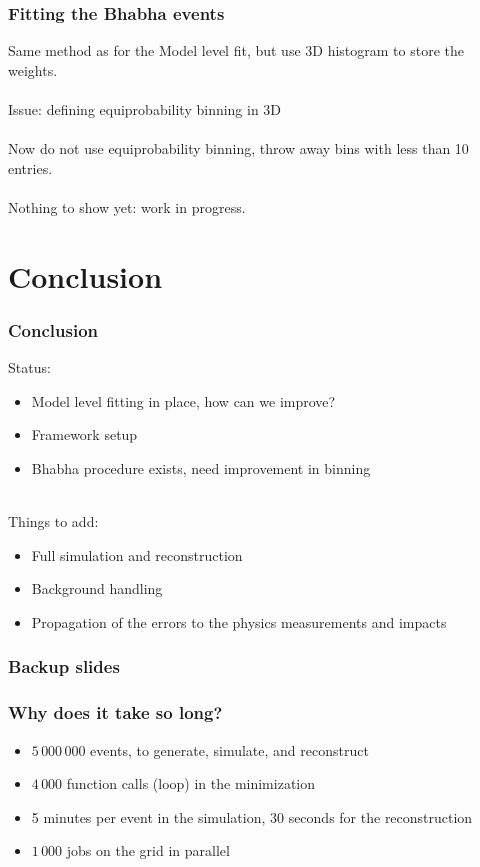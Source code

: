 \documentclass{beamer}
\begin{document}
\begin{frame}
\frametitle{Fitting the Bhabha events}
Same method as for the Model level fit, but use 3D histogram to store the
weights.\\
~\\
Issue: defining equiprobability binning in 3D\\
~\\
Now do not use equiprobability binning, throw away bins with less than 10
entries.\\
~\\
Nothing to show yet: \alert{work in progress}.
\end{frame}



\section{Conclusion}
\begin{frame}
\frametitle{Conclusion}
Status:
\begin{itemize}
  \item Model level fitting in place, how can we improve?
  \item Framework setup
  \item Bhabha procedure exists, need improvement in binning
\end{itemize}
~\\
Things to add:
\begin{itemize}
  \item Full simulation and reconstruction
  \item Background handling
  \item Propagation of the errors to the physics measurements and impacts
\end{itemize}
\end{frame}

\appendix
\begin{frame}
\frametitle{Backup slides}
\end{frame}
\begin{frame}
\frametitle{Why does it take so long?}\label{slide:timing}
\begin{itemize}
  \item $5\,000\,000$ events, to generate, simulate, and reconstruct
  \item $4\,000$ function calls (loop) in the minimization
  \item 5 minutes per event in the simulation, 30 seconds for the reconstruction
  \item $1\,000$ jobs on the grid in parallel
\end{itemize}
\end{frame}
\end{document}
